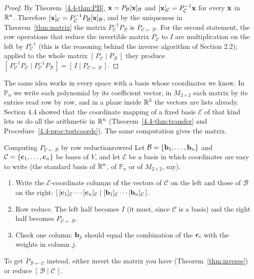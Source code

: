 \documentclass[11pt]{article}
\begin{document}
\begin{proof}
By Theorem~\ref{4.4-thm:PB}, $\mathbf{x}=P_{\mathcal{B}}[\mathbf{x}]_{\mathcal{B}}$ and $[\mathbf{x}]_{\mathcal{C}}=P_{\mathcal{C}}^{-1}\mathbf{x}$ for every $\mathbf{x}$ in $\mathbb{R}^n$. Therefore $[\mathbf{x}]_{\mathcal{C}}=P_{\mathcal{C}}^{-1}P_{\mathcal{B}}[\mathbf{x}]_{\mathcal{B}}$, and by the uniqueness in Theorem~\ref{thm:matrix} the matrix $P_{\mathcal{C}}^{-1}P_{\mathcal{B}}$ is $P_{\mathcal{C}\leftarrow\mathcal{B}}$. For the second statement, the row operations that reduce the invertible matrix $P_{\mathcal{C}}$ to $I$ are multiplication on the left by $P_{\mathcal{C}}^{-1}$ (this is the reasoning behind the inverse algorithm of Section 2.2); applied to the whole matrix $[\,P_{\mathcal{C}}\mid P_{\mathcal{B}}\,]$ they produce $[\,P_{\mathcal{C}}^{-1}P_{\mathcal{C}}\mid P_{\mathcal{C}}^{-1}P_{\mathcal{B}}\,]=[\,I\mid P_{\mathcal{C}\leftarrow\mathcal{B}}\,]$.
\end{proof}

The same idea works in every space with a basis whose coordinates we know. In $\mathbb{P}_n$ we write each polynomial by its coefficient vector, in $M_{2\times2}$ each matrix by its entries read row by row, and in a plane inside $\mathbb{R}^3$ the vectors are lists already. Section 4.4 showed that the coordinate mapping of a fixed basis $\mathcal{E}$ of that kind lets us do all the arithmetic in $\mathbb{R}^n$ (Theorem~\ref{4.4-thm:transfer} and Procedure~\ref{4.4-proc:testcoords}). The same computation gives the matrix.

\begin{proc}{Computing $P_{\mathcal{C}\leftarrow\mathcal{B}}$ by row reduction}{rowred}
Let $\mathcal{B}=\{\mathbf{b}_1,\dots,\mathbf{b}_n\}$ and $\mathcal{C}=\{\mathbf{c}_1,\dots,\mathbf{c}_n\}$ be bases of $V$, and let $\mathcal{E}$ be a basis in which coordinates are easy to write (the standard basis of $\mathbb{R}^n$, of $\mathbb{P}_n$ or of $M_{2\times2}$, say).
\begin{enumerate}[label=\arabic*.,itemsep=1pt]
  \item Write the $\mathcal{E}$-coordinate columns of the vectors of $\mathcal{C}$ on the left and those of $\mathcal{B}$ on the right: $[\,[\mathbf{c}_1]_{\mathcal{E}}\cdots[\mathbf{c}_n]_{\mathcal{E}}\mid[\mathbf{b}_1]_{\mathcal{E}}\cdots[\mathbf{b}_n]_{\mathcal{E}}\,]$.
  \item Row reduce. The left half becomes $I$ (it must, since $\mathcal{C}$ is a basis) and the right half becomes $P_{\mathcal{C}\leftarrow\mathcal{B}}$.
  \item Check one column: $\mathbf{b}_j$ should equal the combination of the $\mathbf{c}_i$ with the weights in column $j$.
\end{enumerate}
To get $P_{\mathcal{B}\leftarrow\mathcal{C}}$ instead, either invert the matrix you have (Theorem~\ref{thm:inverse}) or reduce $[\,\mathcal{B}\mid\mathcal{C}\,]$.
\end{proc}
\end{document}
